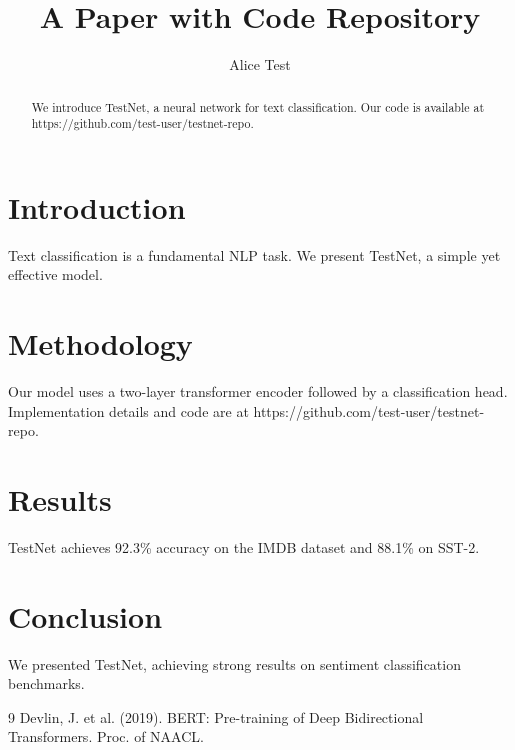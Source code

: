 \documentclass{article}
\title{A Paper with Code Repository}
\author{Alice Test}
\begin{document}
\maketitle

\begin{abstract}
We introduce TestNet, a neural network for text classification.
Our code is available at https://github.com/test-user/testnet-repo.
\end{abstract}

\section{Introduction}
\label{sec:intro}

Text classification is a fundamental NLP task.
We present TestNet, a simple yet effective model.

\section{Methodology}
\label{sec:method}

Our model uses a two-layer transformer encoder followed by a classification head.
Implementation details and code are at https://github.com/test-user/testnet-repo.

\section{Results}
\label{sec:results}

TestNet achieves 92.3\% accuracy on the IMDB dataset and 88.1\% on SST-2.

\section{Conclusion}
\label{sec:conclusion}

We presented TestNet, achieving strong results on sentiment classification benchmarks.

\begin{thebibliography}{9}
 Devlin, J. et al. (2019). BERT: Pre-training of Deep Bidirectional Transformers. Proc. of NAACL.
\end{thebibliography}
\end{document}
